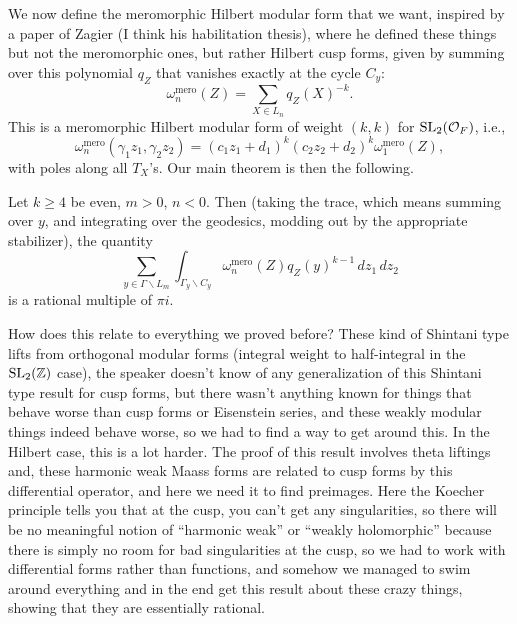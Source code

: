 \documentclass[reqno]{amsart} 
\numberwithin{theorem}{section}
\numberwithin{equation}{section}
\begin{document}
We now define the meromorphic Hilbert modular form that we want, inspired by a paper of Zagier (I think his habilitation thesis), where he defined these things but not the meromorphic ones, but rather Hilbert cusp forms, given by summing over this polynomial $q_Z$ that vanishes exactly at the cycle $C_y$:
\begin{equation*}
  \omega_n^{\mathrm{mero}}(Z) = \sum_{X \in L_n}
  q_Z(X)^{- k}.
\end{equation*}
This is a meromorphic Hilbert modular form of weight $(k, k)$ for $\operatorname{SL}_2(\mathcal{O}_F)$, i.e.,
\begin{equation*}
  \omega_n^{\mathrm{mero}}(\gamma_1 z_1, \gamma_2 z_2) = (c_1 z_1 + d_1)^k (c_2 z_2 + d_2)^k \omega_1^{\mathrm{mero}}(Z),
\end{equation*}
with poles along all $T_X$'s.  Our main theorem is then the following.
\begin{theorem}
  Let $k \geq 4$ be even, $m > 0$, $n < 0$.  Then (taking the trace, which means summing over $y$, and integrating over the geodesics, modding out by the appropriate stabilizer), the quantity
  \begin{equation*}
    \sum_{y \in \Gamma \backslash L_m} \int_{\Gamma_y \backslash C_y} \omega_n^{\mathrm{mero}}(Z) q_Z(y)^{k - 1} \, d z_1 \, d z_2
  \end{equation*}
  is a rational multiple of $\pi i$.
\end{theorem}

How does this relate to everything we proved before?  These kind of Shintani type lifts from orthogonal modular forms (integral weight to half-integral in the $\operatorname{SL}_2(\mathbb{Z})$ case), the speaker doesn't know of any generalization of this Shintani type result for cusp forms, but there wasn't anything known for things that behave worse than cusp forms or Eisenstein series, and these weakly modular things indeed behave worse, so we had to find a way to get around this.  In the Hilbert case, this is a lot harder.  The proof of this result involves theta liftings and, these harmonic weak Maass forms are related to cusp forms by this differential operator, and here we need it to find preimages.  Here the Koecher principle tells you that at the cusp, you can't get any singularities, so there will be no meaningful notion of ``harmonic weak'' or ``weakly holomorphic'' because there is simply no room for bad singularities at the cusp, so we had to work with differential forms rather than functions, and somehow we managed to swim around everything and in the end get this result about these crazy things, showing that they are essentially rational.
\end{document}
